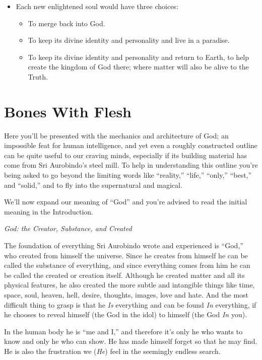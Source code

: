 \documentclass[12pt,a4paper]{book}
\begin{document}
\begin{itemize}
\item Each new enlightened soul would have three choices:

\begin{itemize}
\item To merge back into God.
\item To keep its divine identity and personality and live in a paradise.
\item To keep its divine identity and personality and return to Earth,
  to help create the kingdom of God there; where matter will also be
  alive to the Truth.
\end{itemize}
\end{itemize}


\chapter*{Bones With Flesh}

Here you'll be presented with the mechanics and architecture of God;
an impossible feat for human intelligence, and yet even a roughly
constructed outline can be quite useful to our craving minds,
especially if its building material has come from Sri Aurobindo's
steel mill. To help in understanding this outline you're being asked
to go beyond the limiting words like ``reality,'' ``life,'' ``only,''
``best,'' and ``solid,'' and to fly into the supernatural and magical.

We'll now expand our meaning of ``God'' and you're advised to read the
initial meaning in the Introduction.

\noindent \emph{God: the Creator, Substance, and Created}

The foundation of everything Sri Aurobindo wrote and experienced is
``God,'' who created from himself the universe. Since he creates from
himself he can be called the substance of everything, and since
everything comes from him he can be called the created or creation
itself. Although he created matter and all its physical features, he
also created the more subtle and intangible things like time, space,
soul, heaven, hell, desire, thoughts, images, love and hate. And the
most difficult thing to grasp is that he \emph{Is} everything and can be
found \emph{In} everything, if he chooses to reveal himself (the God in the
idol) to himself (the God \emph{In} you).

In the human body he is ``me and I,'' and therefore it's only he who
wants to know and only he who can show. He has made himself forget so
that he may find. He is also the frustration we (\emph{He}) feel in the
seemingly endless search.
\end{document}
